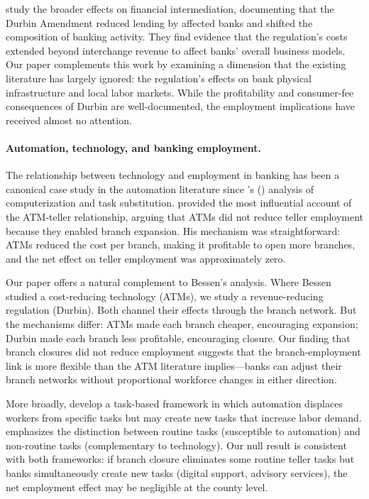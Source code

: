 \documentclass[12pt]{article}
\begin{document}
\citet{mukharlyamov2023} study the broader effects on financial intermediation, documenting that the Durbin Amendment reduced lending by affected banks and shifted the composition of banking activity. They find evidence that the regulation's costs extended beyond interchange revenue to affect banks' overall business models. Our paper complements this work by examining a dimension that the existing literature has largely ignored: the regulation's effects on bank physical infrastructure and local labor markets. While the profitability and consumer-fee consequences of Durbin are well-documented, the employment implications have received almost no attention.

\paragraph{Automation, technology, and banking employment.} The relationship between technology and employment in banking has been a canonical case study in the automation literature since \citeauthor{autor2003}'s (\citeyear{autor2003}) analysis of computerization and task substitution. \citet{bessen2015} provided the most influential account of the ATM-teller relationship, arguing that ATMs did not reduce teller employment because they enabled branch expansion. His mechanism was straightforward: ATMs reduced the cost per branch, making it profitable to open more branches, and the net effect on teller employment was approximately zero.

Our paper offers a natural complement to Bessen's analysis. Where Bessen studied a cost-reducing technology (ATMs), we study a revenue-reducing regulation (Durbin). Both channel their effects through the branch network. But the mechanisms differ: ATMs made each branch cheaper, encouraging expansion; Durbin made each branch less profitable, encouraging closure. Our finding that branch closures did not reduce employment suggests that the branch-employment link is more flexible than the ATM literature implies---banks can adjust their branch networks without proportional workforce changes in either direction.

More broadly, \citet{acemoglu2019} develop a task-based framework in which automation displaces workers from specific tasks but may create new tasks that increase labor demand. \citet{autor2015} emphasizes the distinction between routine tasks (susceptible to automation) and non-routine tasks (complementary to technology). Our null result is consistent with both frameworks: if branch closure eliminates some routine teller tasks but banks simultaneously create new tasks (digital support, advisory services), the net employment effect may be negligible at the county level.
\end{document}
